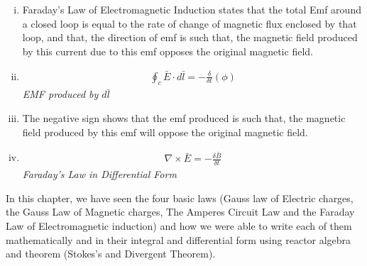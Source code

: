 \begin{mdframed}[backgroundcolor=lightblue, linewidth=1pt, hidealllines=true]
\begin{enumerate}[(i)]
\item Faraday's Law of Electromagnetic Induction states that the total Emf around a closed loop is equal to the rate of change of magnetic flux enclosed by that loop, and that, the direction of emf is such that, the magnetic field produced by this current due to this emf opposes the original magnetic field. 

\item \begin{align*}
\oint_c\bar{E} \cdot d\bar{l} = -\frac{\delta}{\delta t}(\phi)
\end{align*}
\emph{EMF produced by $d\bar{l}$}

\item The negative sign shows that the emf produced is such that, the magnetic field produced by this emf will oppose the original magnetic field. 

\item 
\begin{align*}
\nabla \times \bar{E} = -\frac{\delta \bar{B}}{\delta t}
\end{align*}
\emph{Faraday's Law in Differential Form}
\end{enumerate}
In this chapter, we have seen the four basic laws (Gauss law of Electric charges, the Gauss Law of Magnetic charges, The Amperes Circuit Law and the Faraday Law of Electromagnetic induction) and how we were able to write each of them mathematically and in their integral and differential form using reactor algebra and theorem (Stokes's and Divergent Theorem).
\end{mdframed}


